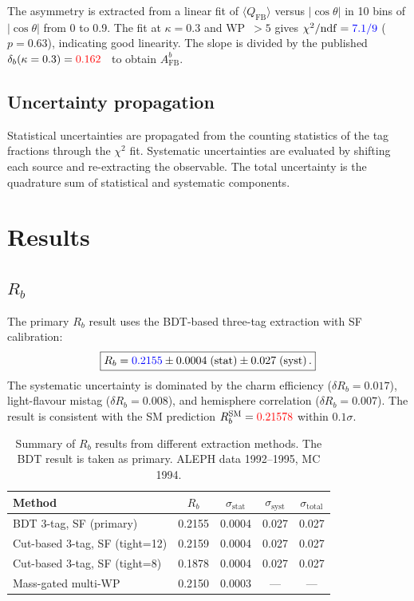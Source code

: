\documentclass[11pt,a4paper]{article}
\newcommand{\measured}[1]{\textcolor{blue}{#1}}
\newcommand{\external}[1]{\textcolor{red}{#1}}
\begin{document}
The asymmetry is extracted from a linear fit of
$\langle Q_\mathrm{FB} \rangle$ versus $|\cos\theta|$ in 10 bins of
$|\cos\theta|$ from 0 to 0.9.  The fit at $\kappa = 0.3$ and WP~$> 5$
gives $\chi^2/\mathrm{ndf} = \measured{7.1/9}$ ($p = 0.63$),
indicating good linearity.  The slope is divided by the published
$\delta_b(\kappa = 0.3) = \external{0.162}$~\cite{LEP:EWWG:2005} to
obtain $A_\mathrm{FB}^b$.

\subsection{Uncertainty propagation}

Statistical uncertainties are propagated from the counting statistics of
the tag fractions through the $\chi^2$ fit.  Systematic uncertainties are
evaluated by shifting each source and re-extracting the observable.  The
total uncertainty is the quadrature sum of statistical and systematic
components.

\section{Results}
\label{sec:results}

\subsection{$R_b$}

The primary $R_b$ result uses the BDT-based three-tag extraction with
SF calibration:
\begin{equation}
\boxed{
  R_b = \measured{0.2155} \pm 0.0004\;\mathrm{(stat)} \pm
  0.027\;\mathrm{(syst)}\,.
}
\label{eq:rb-result}
\end{equation}
The systematic uncertainty is dominated by the charm efficiency
($\delta R_b = 0.017$), light-flavour mistag ($\delta R_b = 0.008$),
and hemisphere correlation ($\delta R_b = 0.007$).  The result is
consistent with the SM prediction $R_b^\mathrm{SM} = \external{0.21578}$
within $0.1\sigma$.

\begin{table}[htbp]
\centering
\caption{Summary of $R_b$ results from different extraction methods.
  The BDT result is taken as primary.  ALEPH data 1992--1995, MC 1994.}
\label{tbl:rb-results}
\begin{tabular}{lcccc}
\toprule
Method & $R_b$ & $\sigma_\mathrm{stat}$ & $\sigma_\mathrm{syst}$ & $\sigma_\mathrm{total}$ \\
\midrule
BDT 3-tag, SF (primary) & 0.2155 & 0.0004 & 0.027 & 0.027 \\
Cut-based 3-tag, SF (tight=12) & 0.2159 & 0.0004 & 0.027 & 0.027 \\
Cut-based 3-tag, SF (tight=8) & 0.1878 & 0.0004 & 0.027 & 0.027 \\
Mass-gated multi-WP & 0.2150 & 0.0003 & --- & --- \\
\bottomrule
\end{tabular}
\end{table}
\end{document}
